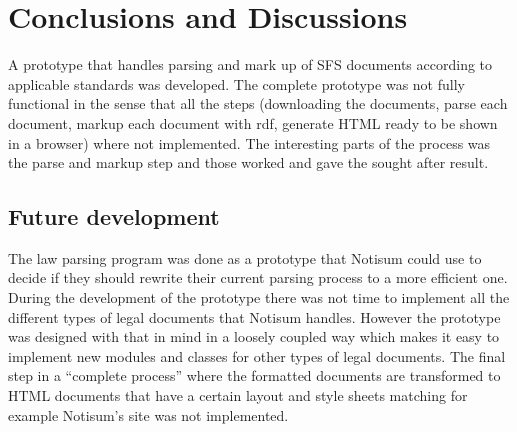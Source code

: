 \chapter{Conclusions and Discussions}

A prototype that handles parsing and mark up of SFS documents according to applicable standards was developed. The complete prototype was not fully functional in the sense that all the steps (downloading the documents, parse each document, markup each document with rdf, generate HTML ready to be shown in a browser) where not implemented. The interesting parts of the process was the parse and markup step and those worked and gave the sought after result.

\section{Future development}
The law parsing program was done as a prototype that Notisum could use to decide if they should rewrite their current parsing process to a more efficient one. During the development of the prototype there was not time to implement all the different types of legal documents that Notisum handles. However the prototype was designed with that in mind in a loosely coupled way which makes it easy to implement new modules and classes for other types of legal documents. The final step in a “complete process” where the formatted documents are transformed to HTML documents that have a certain layout and style sheets matching for example Notisum’s site was not implemented. 

